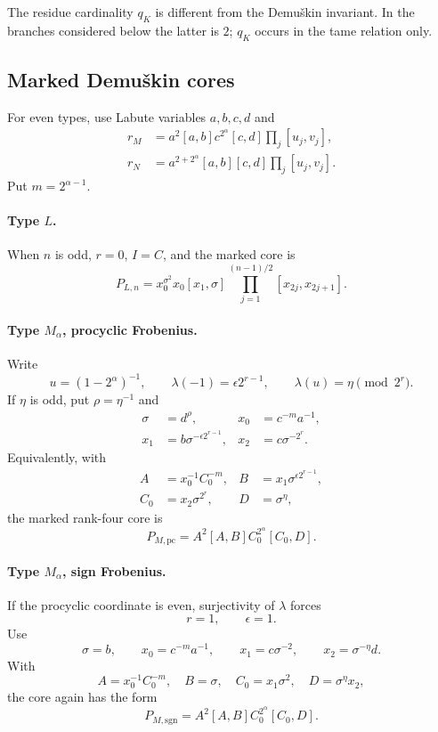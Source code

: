 \documentclass[11pt,reqno]{amsart}
\theoremstyle{definition}
\theoremstyle{remark}
\numberwithin{equation}{section}
\newcommand{\pc}{\mathrm{pc}}
\newcommand{\sgn}{\mathrm{sgn}}
\begin{document}
The residue cardinality \(q_K\) is different from the Demu\v{s}kin
invariant.  In the branches considered below the latter is \(2\);
\(q_K\) occurs in the tame relation only.

\subsection{Marked Demu\v{s}kin cores}

For even types, use Labute variables \(a,b,c,d\) and
\[
\begin{aligned}
 r_M&=a^2[a,b]c^{2^\alpha}[c,d]\prod_j[u_j,v_j],\\
 r_N&=a^{2+2^\alpha}[a,b][c,d]\prod_j[u_j,v_j].
\end{aligned}
\]
Put \(m=2^{\alpha-1}\).

\paragraph{Type \(L\).}
When \(n\) is odd, \(r=0\), \(I=C\), and the marked core is
\begin{equation}\label{eq:Lcore}
 P_{L,n}=x_0^{\sigma^2}x_0[x_1,\sigma]
 \prod_{j=1}^{(n-1)/2}[x_{2j},x_{2j+1}].
\end{equation}

\paragraph{Type \(M_\alpha\), procyclic Frobenius.}
Write
\[
 u=(1-2^\alpha)^{-1},\qquad
 \lambda(-1)=\epsilon2^{r-1},\qquad
 \lambda(u)=\eta\pmod{2^r}.
\]
If \(\eta\) is odd, put \(\rho=\eta^{-1}\) and
\[
\begin{aligned}
 \sigma&=d^\rho,& x_0&=c^{-m}a^{-1},\\
 x_1&=b\sigma^{-\epsilon2^{r-1}},&
 x_2&=c\sigma^{-2^r}.
\end{aligned}
\]
Equivalently, with
\[
\begin{aligned}
 A&=x_0^{-1}C_0^{-m},&
 B&=x_1\sigma^{\epsilon2^{r-1}},\\
 C_0&=x_2\sigma^{2^r},&
 D&=\sigma^\eta,
\end{aligned}
\]
the marked rank-four core is
\begin{equation}\label{eq:Mpc-core}
 P_{M,\pc}=A^2[A,B]C_0^{2^\alpha}[C_0,D].
\end{equation}

\paragraph{Type \(M_\alpha\), sign Frobenius.}
If the procyclic coordinate is even, surjectivity of \(\lambda\) forces
\[
 r=1,\qquad \epsilon=1.
\]
Use
\[
 \sigma=b,\qquad x_0=c^{-m}a^{-1},\qquad
 x_1=c\sigma^{-2},\qquad x_2=\sigma^{-\eta}d.
\]
With
\[
 A=x_0^{-1}C_0^{-m},\quad B=\sigma,\quad
 C_0=x_1\sigma^2,\quad D=\sigma^\eta x_2,
\]
the core again has the form
\begin{equation}\label{eq:Msign-core}
 P_{M,\sgn}=A^2[A,B]C_0^{2^\alpha}[C_0,D].
\end{equation}
\end{document}
